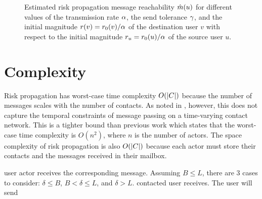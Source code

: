 \begin{figure}[htbp]
\caption[Estimated risk propagation message reachability]{Estimated risk
propagation message reachability $\hat{m}(u)$ for different values of the
transmission rate $\alpha$, the send tolerance $\gamma$, and the
initial magnitude $r(v) = r_0(v) / \alpha$ of
the destination user $v$ with respect to the initial magnitude $r_u
= r_0(u) / \alpha$ of the source user $u$.}
\label{fig:reach}
\end{figure}

\section{Complexity}

Risk propagation has worst-case time complexity $O(\left\vert C \right\vert)$
because the number of messages scales with the number of contacts. As noted in
, however, this does not capture the temporal
constraints of message passing on a time-varying contact network. This is a
tighter bound than previous work \cite{Ayday2021} which states that the
worst-case time complexity is $O(n^2)$, where $n$ is the number of actors.
The space complexity of risk propagation is also $O(\left\vert C \right\vert)$ because
each actor must store their contacts and the messages received in their
mailbox.

user actor receives the corresponding message. Assuming $B \leq L$, there are 3
cases to consider: $\delta \leq B$, $B < \delta \leq L$, and $\delta > L$.
%
%
contacted user receives. The user will send